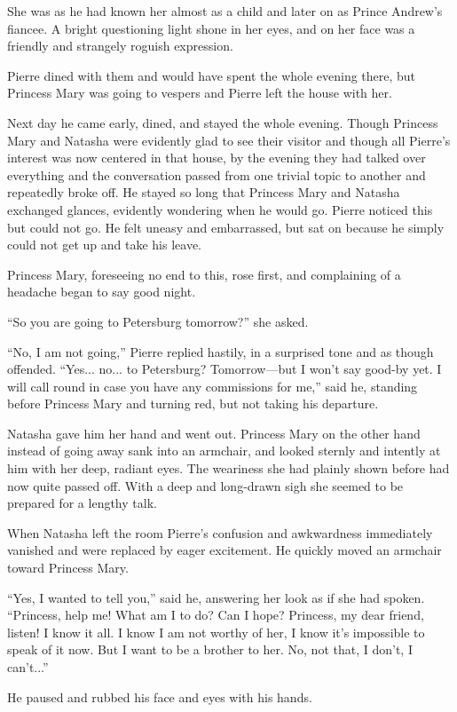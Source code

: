She was as he had known her almost as a child and later on as
Prince Andrew's fiancee. A bright questioning light shone in her
eyes, and on her face was a friendly and strangely roguish
expression.

Pierre dined with them and would have spent the whole evening
there, but Princess Mary was going to vespers and Pierre left the
house with her.

Next day he came early, dined, and stayed the whole
evening. Though Princess Mary and Natasha were evidently glad to
see their visitor and though all Pierre's interest was now
centered in that house, by the evening they had talked over
everything and the conversation passed from one trivial topic to
another and repeatedly broke off. He stayed so long that Princess
Mary and Natasha exchanged glances, evidently wondering when he
would go. Pierre noticed this but could not go. He felt uneasy
and embarrassed, but sat on because he simply could not get up
and take his leave.

Princess Mary, foreseeing no end to this, rose first, and
complaining of a headache began to say good night.

``So you are going to Petersburg tomorrow?'' she asked.

``No, I am not going,'' Pierre replied hastily, in a surprised
tone and as though offended. ``Yes... no... to Petersburg?
Tomorrow---but I won't say good-by yet. I will call round in case
you have any commissions for me,'' said he, standing before
Princess Mary and turning red, but not taking his departure.

Natasha gave him her hand and went out. Princess Mary on the
other hand instead of going away sank into an armchair, and
looked sternly and intently at him with her deep, radiant
eyes. The weariness she had plainly shown before had now quite
passed off. With a deep and long-drawn sigh she seemed to be
prepared for a lengthy talk.

When Natasha left the room Pierre's confusion and awkwardness
immediately vanished and were replaced by eager excitement. He
quickly moved an armchair toward Princess Mary.

``Yes, I wanted to tell you,'' said he, answering her look as if
she had spoken. ``Princess, help me! What am I to do? Can I hope?
Princess, my dear friend, listen! I know it all. I know I am not
worthy of her, I know it's impossible to speak of it now. But I
want to be a brother to her. No, not that, I don't, I can't...''

He paused and rubbed his face and eyes with his hands.

